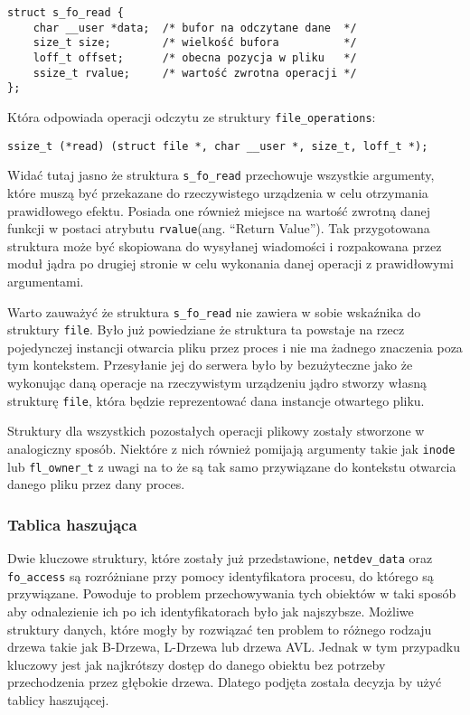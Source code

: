 \documentclass[10pt]{article}
\begin{document}
\begin{verbatim}
struct s_fo_read {
    char __user *data;  /* bufor na odczytane dane  */
    size_t size;        /* wielkość bufora          */
    loff_t offset;      /* obecna pozycja w pliku   */
    ssize_t rvalue;     /* wartość zwrotna operacji */
};
\end{verbatim}

Która odpowiada operacji odczytu ze struktury \texttt{file\_operations}:

\begin{verbatim}
ssize_t (*read) (struct file *, char __user *, size_t, loff_t *);
\end{verbatim}

Widać tutaj jasno że struktura \texttt{s\_fo\_read} przechowuje wszystkie argumenty, które muszą być przekazane do rzeczywistego urządzenia w celu otrzymania prawidłowego efektu. Posiada one również miejsce na wartość zwrotną danej funkcji w postaci atrybutu \texttt{rvalue}(ang. ``Return Value''). Tak przygotowana struktura może być skopiowana do wysyłanej wiadomości i rozpakowana przez moduł jądra po drugiej stronie w celu wykonania danej operacji z prawidłowymi argumentami.

Warto zauważyć że struktura \texttt{s\_fo\_read} nie zawiera w sobie wskaźnika do struktury \texttt{file}. Było już powiedziane że struktura ta powstaje na rzecz pojedynczej instancji otwarcia pliku przez proces i nie ma żadnego znaczenia poza tym kontekstem. Przesyłanie jej do serwera było by bezużyteczne jako że wykonując daną operacje na rzeczywistym urządzeniu jądro stworzy własną strukturę \texttt{file}, która będzie reprezentować dana instancje otwartego pliku.

Struktury dla wszystkich pozostałych operacji plikowy zostały stworzone w analogiczny sposób. Niektóre z nich również pomijają argumenty takie jak \texttt{inode} lub \texttt{fl\_owner\_t} z uwagi na to że są tak samo przywiązane do kontekstu otwarcia danego pliku przez dany proces.

\subsubsection{Tablica haszująca}

Dwie kluczowe struktury, które zostały już przedstawione, \texttt{netdev\_data} oraz \texttt{fo\_access} są rozróżniane przy pomocy identyfikatora procesu, do którego są przywiązane. Powoduje to problem przechowywania tych obiektów w taki sposób aby odnalezienie ich po ich identyfikatorach było jak najszybsze. Możliwe struktury danych, które mogły by rozwiązać ten problem to różnego rodzaju drzewa takie jak B-Drzewa, L-Drzewa lub drzewa AVL. Jednak w tym przypadku kluczowy jest jak najkrótszy dostęp do danego obiektu bez potrzeby przechodzenia przez głębokie drzewa. Dlatego podjęta została decyzja by użyć tablicy haszującej.
\end{document}
